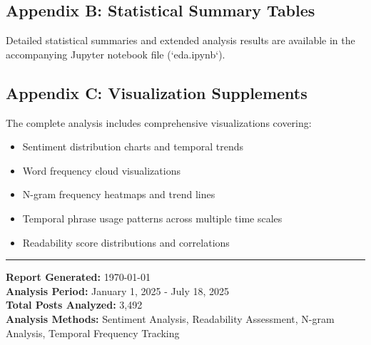 \documentclass[12pt,a4paper]{article}
\begin{document}
\subsection{Appendix B: Statistical Summary Tables}

Detailed statistical summaries and extended analysis results are available in the accompanying Jupyter notebook file (`eda.ipynb`).

\subsection{Appendix C: Visualization Supplements}

The complete analysis includes comprehensive visualizations covering:
\begin{itemize}
    \item Sentiment distribution charts and temporal trends
    \item Word frequency cloud visualizations
    \item N-gram frequency heatmaps and trend lines
    \item Temporal phrase usage patterns across multiple time scales
    \item Readability score distributions and correlations
\end{itemize}

\vspace{1cm}

\hrule

\vspace{0.5cm}

\textbf{Report Generated:} \today \\
\textbf{Analysis Period:} January 1, 2025 - July 18, 2025 \\
\textbf{Total Posts Analyzed:} 3,492 \\
\textbf{Analysis Methods:} Sentiment Analysis, Readability Assessment, N-gram Analysis, Temporal Frequency Tracking
\end{document}
